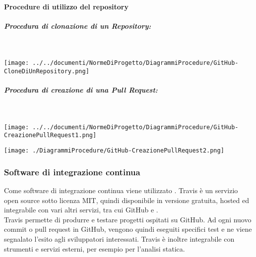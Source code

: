 \paragraph{Procedure di utilizzo del repository}\mbox{}


\begin{samepage}
	\subparagraph{Procedura di clonazione di un Repository:}\mbox{}\\	
	\begin{center}
		\texttt{[image: ../../documenti/NormeDiProgetto/DiagrammiProcedure/GitHub-CloneDiUnRepository.png]}
	\end{center}
\end{samepage}

\begin{samepage}
	\subparagraph{Procedura di creazione di una Pull Request:}\mbox{}\\
	
	\begin{center}
		\texttt{[image: ../../documenti/NormeDiProgetto/DiagrammiProcedure/GitHub-CreazionePullRequest1.png]}
	\end{center}	
\end{samepage}

\begin{center}
	\texttt{[image: ./DiagrammiProcedure/GitHub-CreazionePullRequest2.png]}
\end{center}

\subsubsection{Software di integrazione continua}
Come software di integrazione continua viene utilizzato \textbf{}.
Travis è un servizio open source sotto licenza MIT, quindi disponibile in versione gratuita, hosted ed integrabile con vari altri servizi, tra cui GitHub e .\\ Travis permette di produrre e testare progetti ospitati su GitHub. Ad ogni nuovo commit o pull request in GitHub, vengono quindi eseguiti specifici test e ne viene segnalato l'esito agli sviluppatori interessati. Travis è inoltre integrabile con strumenti e servizi esterni, per esempio per l'analisi statica.

